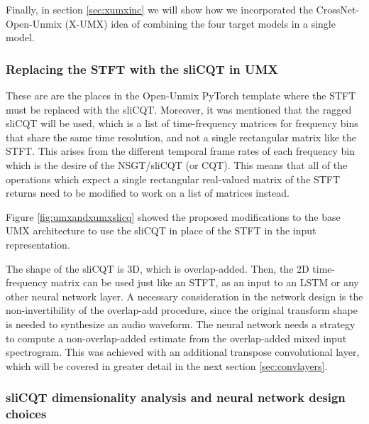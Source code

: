 \documentclass[report.tex]{subfiles}
\begin{document}
Finally, in section \ref{sec:xumxinc} we will show how we incorporated the CrossNet-Open-Unmix (X-UMX) idea of combining the four target models in a single model.

\subsubsection{Replacing the STFT with the sliCQT in UMX}
\label{sec:replacestft}


These are are the places in the Open-Unmix PyTorch template where the STFT must be replaced with the sliCQT. Moreover, it was mentioned that the ragged sliCQT will be used, which is a list of time-frequency matrices for frequency bins that share the same time resolution, and not a single rectangular matrix like the STFT. This arises from the different temporal frame rates of each frequency bin which is the desire of the NSGT/sliCQT (or CQT). This means that all of the operations which expect a single rectangular real-valued matrix of the STFT returns need to be modified to work on a list of matrices instead.

Figure \ref{fig:umxandxumxslicq} showed the proposed modifications to the base UMX architecture to use the sliCQT in place of the STFT in the input representation.

The shape of the sliCQT is 3D, which is overlap-added. Then, the 2D time-frequency matrix can be used just like an STFT, as an input to an LSTM or any other neural network layer. A necessary consideration in the network design is the non-invertibility of the overlap-add procedure, since the original transform shape is needed to synthesize an audio waveform. The neural network needs a strategy to compute a non-overlap-added estimate from the overlap-added mixed input spectrogram. This was achieved with an additional transpose convolutional layer, which will be covered in greater detail in the next section \ref{sec:convlayers}.

\subsubsection{sliCQT dimensionality analysis and neural network design choices}
\label{sec:slicqdim}

\end{document}

